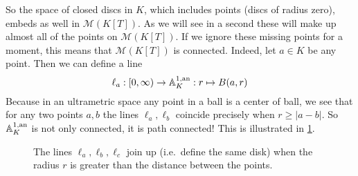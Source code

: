 So the space of closed discs in $K$, which includes points (discs of radius zero), embeds as well in $\mathcal{M} (K[T])$. 
As we will see in a second these will make up almost all of the points on $\mathcal{M} (K[T])$. 
If we ignore these missing points for a moment, this means that $\mathcal{M}(K[T])$ is connected. 
Indeed, let $a \in K$ be any point. Then we can define a line \begin{equation}\label{eq:line_in_A_1}
	\ell_a: [0, \infty) \to  \mathbb{A}_K^{1, \text{an}}: r\mapsto B(a, r)
\end{equation}
Because in an ultrametric space any point in a ball is a center of ball, we see that for any two points $a, b$ the lines $\ell_a, \ell_b$ coincide precisely when $r \ge |a - b|$. 
So $\mathbb{A}_K^{1,\text{an}}$ is not only connected, it is path connected!
This is illustrated in \cref{fig:the_lines_la_lb_lc}. 
\begin{figure}[h]
    \centering
    \caption{The lines $\ell_a, \ell_b, \ell_c$ join up (i.e.\ define the same disk) when the radius $r$ is greater than the distance between the points.}
    \label{fig:the_lines_la_lb_lc}
\end{figure}

